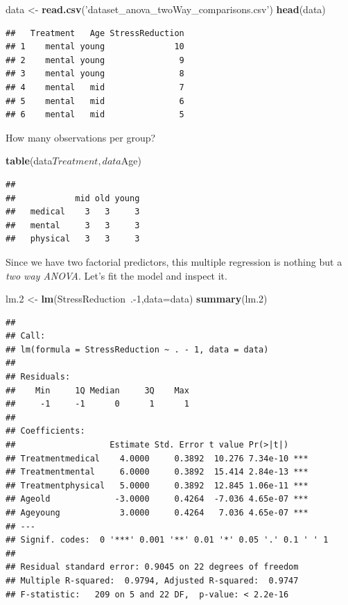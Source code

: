 \documentclass[]{book}
\newenvironment{Shaded}{\begin{snugshade}}{\end{snugshade}}
\newcommand{\KeywordTok}[1]{\textcolor[rgb]{0.13,0.29,0.53}{\textbf{{#1}}}}
\newcommand{\DataTypeTok}[1]{\textcolor[rgb]{0.13,0.29,0.53}{{#1}}}
\newcommand{\DecValTok}[1]{\textcolor[rgb]{0.00,0.00,0.81}{{#1}}}
\newcommand{\FloatTok}[1]{\textcolor[rgb]{0.00,0.00,0.81}{{#1}}}
\newcommand{\StringTok}[1]{\textcolor[rgb]{0.31,0.60,0.02}{{#1}}}
\newcommand{\NormalTok}[1]{{#1}}
\theoremstyle{definition}
\theoremstyle{definition}
\theoremstyle{remark}
\begin{document}
\begin{Shaded}
\begin{Highlighting}[]
\NormalTok{data <-}\StringTok{ }\KeywordTok{read.csv}\NormalTok{(}\StringTok{'dataset_anova_twoWay_comparisons.csv'}\NormalTok{)}
\KeywordTok{head}\NormalTok{(data)}
\end{Highlighting}
\end{Shaded}

\begin{verbatim}
##   Treatment   Age StressReduction
## 1    mental young              10
## 2    mental young               9
## 3    mental young               8
## 4    mental   mid               7
## 5    mental   mid               6
## 6    mental   mid               5
\end{verbatim}

How many observations per group?

\begin{Shaded}
\begin{Highlighting}[]
\KeywordTok{table}\NormalTok{(data$Treatment, data$Age)}
\end{Highlighting}
\end{Shaded}

\begin{verbatim}
##           
##            mid old young
##   medical    3   3     3
##   mental     3   3     3
##   physical   3   3     3
\end{verbatim}

Since we have two factorial predictors, this multiple regression is
nothing but a \emph{two way ANOVA}. Let's fit the model and inspect it.

\begin{Shaded}
\begin{Highlighting}[]
\NormalTok{lm}\FloatTok{.2} \NormalTok{<-}\StringTok{ }\KeywordTok{lm}\NormalTok{(StressReduction~.-}\DecValTok{1}\NormalTok{,}\DataTypeTok{data=}\NormalTok{data)}
\KeywordTok{summary}\NormalTok{(lm}\FloatTok{.2}\NormalTok{)}
\end{Highlighting}
\end{Shaded}

\begin{verbatim}
## 
## Call:
## lm(formula = StressReduction ~ . - 1, data = data)
## 
## Residuals:
##    Min     1Q Median     3Q    Max 
##     -1     -1      0      1      1 
## 
## Coefficients:
##                   Estimate Std. Error t value Pr(>|t|)    
## Treatmentmedical    4.0000     0.3892  10.276 7.34e-10 ***
## Treatmentmental     6.0000     0.3892  15.414 2.84e-13 ***
## Treatmentphysical   5.0000     0.3892  12.845 1.06e-11 ***
## Ageold             -3.0000     0.4264  -7.036 4.65e-07 ***
## Ageyoung            3.0000     0.4264   7.036 4.65e-07 ***
## ---
## Signif. codes:  0 '***' 0.001 '**' 0.01 '*' 0.05 '.' 0.1 ' ' 1
## 
## Residual standard error: 0.9045 on 22 degrees of freedom
## Multiple R-squared:  0.9794, Adjusted R-squared:  0.9747 
## F-statistic:   209 on 5 and 22 DF,  p-value: < 2.2e-16
\end{verbatim}
\end{document}
